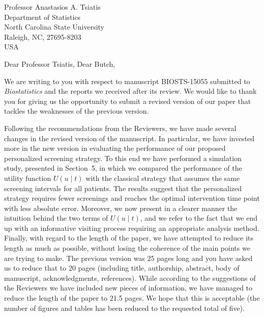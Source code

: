 \documentclass[a4paper, 11pt]{letter}
\begin{document}
\begin{letter}{Professor Anastasios A. Tsiatis\\
Department of Statistics\\
North Carolina State University\\
Raleigh, NC, 27695-8203\\
USA}

\address{Department of Biostatistics\\
Erasmus University Medical Center\\PO Box 2040, 3000 CA Rotterdam\\ the Netherlands
}

\opening{Dear Professor Tsiatis, Dear Butch,}

We are writing to you with respect to manuscript BIOSTS-15055 submitted to \emph{Biostatistics} and the reports we received after its review. We would like to thank you for giving us the opportunity to submit a revised version of our paper that tackles the weaknesses of the previous version.

Following the recommendations from the Reviewers, we have made several changes in the revised version of the manuscript. In particular, we have invested more in the new version in evaluating the performance of our proposed personalized screening strategy. To this end we have performed a simulation study, presented in Section~5, in which we compared the performance of the utility function $U(u \mid t)$ with the classical strategy that assumes the same screening intervals for all patients. The results suggest that the personalized strategy requires fewer screenings and reaches the optimal intervention time point with less absolute error. Moreover, we now present in a clearer manner the intuition behind the two terms of $U(u \mid t)$, and we refer to the fact that we end up with an informative visiting process requiring an appropriate analysis method. Finally, with regard to the length of the paper, we have attempted to reduce its length as much as possible, without losing the coherence of the main points we are trying to make. The previous version was 25 pages long and you have asked us to reduce that to 20 pages (including title, authorship, abstract, body of manuscript, acknowledgments, references). While according to the suggestions of the Reviewers we have included new pieces of information, we have managed to reduce the length of the paper to 21.5 pages. We hope that this is acceptable (the number of figures and tables has been reduced to the requested total of five).


\end{letter}
\end{document}
